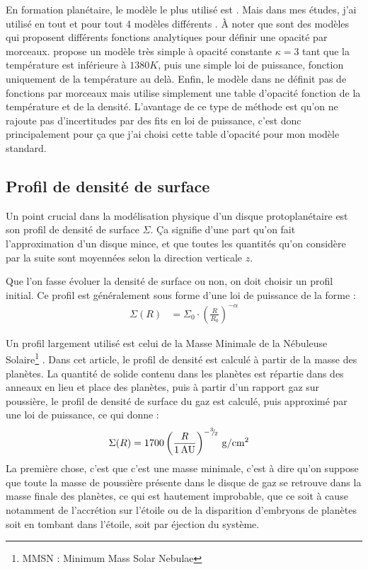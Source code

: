 En formation planétaire, le modèle le plus utilisé est \citep{bell1994FU}. Mais dans mes études, j'ai utilisé en tout et pour tout 4 modèles différents \citep{bell1994FU, zhu2009nonsteady, chambers2009analytic, hure2000transition}. À noter que \citep{bell1994FU, zhu2009nonsteady} sont des modèles qui proposent différents fonctions analytiques pour définir une opacité par morceaux. \citep{chambers2009analytic} propose un modèle très simple à opacité constante $\kappa=3$ tant que la température est inférieure à $1380\unit{K}$, puis une simple loi de puissance, fonction uniquement de la température au delà. Enfin, le modèle dans \citep{hure2000transition} ne définit pas de fonctions par morceaux mais utilise simplement une table d'opacité fonction de la température et de la densité. L'avantage de ce type de méthode est qu'on ne rajoute pas d'incertitudes par des fits en loi de puissance, c'est donc principalement pour ça que j'ai choisi cette table d'opacité pour mon modèle standard. 

\subsection{Profil de densité de surface}
Un point crucial dans la modélisation physique d'un disque protoplanétaire est son profil de densité de surface $\Sigma$. Ça signifie d'une part qu'on fait l'approximation d'un disque mince, et que toutes les quantités qu'on considère par la suite sont moyennées selon la direction verticale $z$.

Que l'on fasse évoluer la densité de surface ou non, on doit choisir un profil initial. Ce profil est généralement sous forme d'une loi de puissance de la forme : 
\begin{align}
\Sigma(R) &= \Sigma_0 \cdot \left(\frac{R}{R_0}\right)^{-\alpha}
\end{align}

Un profil largement utilisé est celui de la Masse Minimale de la Nébuleuse Solaire\footnote{MMSN : Minimum Mass Solar Nebulae} \citep{weidenschilling1977distribution, hayashi1981structure}. Dans cet article, le profil de densité est calculé à partir de la masse des planètes. La quantité de solide contenu dans les planètes est répartie dans des anneaux en lieu et place des planètes, puis à partir d'un rapport gaz sur poussière, le profil de densité de surface du gaz est calculé, puis approximé par une loi de puissance, ce qui donne : 
\begin{align}
\Sigma(R) &= 1700 \left(\frac{R}{1\mathrm{\thinspace AU}}\right)^{-{{}^{3\!\!}/ _{\!2}}} \mathrm{\thinspace g/cm^2}
\end{align}
La première chose, c'est que c'est une masse minimale, c'est à dire qu'on suppose que toute la masse de poussière présente dans le disque de gaz se retrouve dans la masse finale des planètes, ce qui est hautement improbable, que ce soit à cause notamment de l'accrétion sur l'étoile ou de la disparition d'embryons de planètes soit en tombant dans l'étoile, soit par éjection du système.

